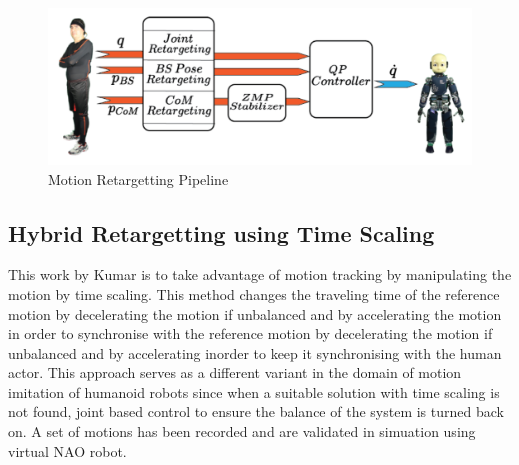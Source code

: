 \begin{figure}[h!]
    \centering
    \includegraphics[scale=0.4]{images/gucci-work.png}\hfill
    \caption{Motion Retargetting Pipeline \cite{gucci:hal-01895145}}\hfill
    \label{fig: gucci's work}
\end{figure}

\subsection{Hybrid Retargetting using Time Scaling}

This work by Kumar \cite{karthikmunirathinam} is to take advantage of motion tracking by manipulating the motion by time scaling. This method changes
the traveling time of the reference motion by decelerating the motion if unbalanced and by accelerating the motion in order to synchronise with the
reference motion by decelerating the motion if unbalanced and by accelerating inorder to keep it synchronising with the human actor. This approach serves as 
a different variant in the domain of motion imitation of humanoid robots since when a suitable solution with time scaling is not found, joint based control 
to ensure the balance of the system is turned back on. A set of motions has been recorded and are validated in simuation using virtual NAO robot. 